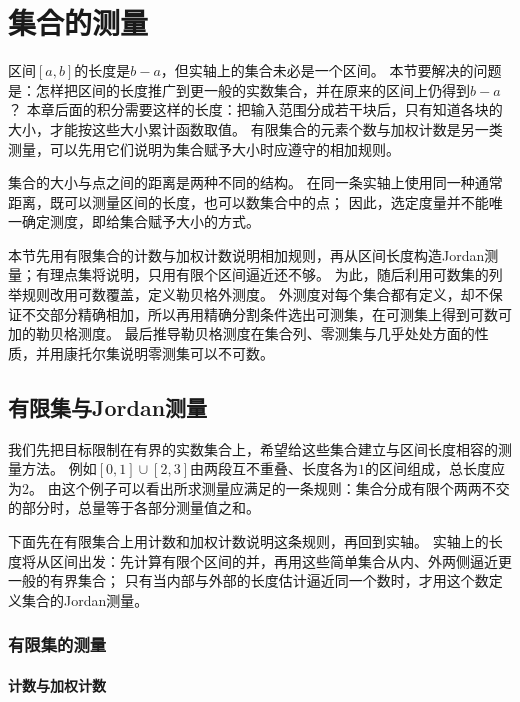 \section{集合的测量}
\label{sec:comb-set-measurement}
\label{sec:analysis-set-structures}

区间$[a,b]$的长度是$b-a$，但实轴上的集合未必是一个区间。
本节要解决的问题是：怎样把区间的长度推广到更一般的实数集合，并在原来的区间上仍得到$b-a$？
本章后面的积分需要这样的长度：把输入范围分成若干块后，只有知道各块的大小，才能按这些大小累计函数取值。
有限集合的元素个数与加权计数是另一类测量，可以先用它们说明为集合赋予大小时应遵守的相加规则。

集合的大小与点之间的距离是两种不同的结构。
在同一条实轴上使用同一种通常距离，既可以测量区间的长度，也可以数集合中的点；
因此，选定度量并不能唯一确定测度，即给集合赋予大小的方式。

本节先用有限集合的计数与加权计数说明相加规则，再从区间长度构造Jordan测量；有理点集将说明，只用有限个区间逼近还不够。
为此，随后利用可数集的列举规则改用可数覆盖，定义勒贝格外测度。
外测度对每个集合都有定义，却不保证不交部分精确相加，所以再用精确分割条件选出可测集，在可测集上得到可数可加的勒贝格测度。
最后推导勒贝格测度在集合列、零测集与几乎处处方面的性质，并用康托尔集说明零测集可以不可数。

\subsection{有限集与Jordan测量}
\label{sec:comb-counting-to-weight}

我们先把目标限制在有界的实数集合上，希望给这些集合建立与区间长度相容的测量方法。
例如$[0,1]\cup[2,3]$由两段互不重叠、长度各为$1$的区间组成，总长度应为$2$。
由这个例子可以看出所求测量应满足的一条规则：集合分成有限个两两不交的部分时，总量等于各部分测量值之和。

下面先在有限集合上用计数和加权计数说明这条规则，再回到实轴。
实轴上的长度将从区间出发：先计算有限个区间的并，再用这些简单集合从内、外两侧逼近更一般的有界集合；
只有当内部与外部的长度估计逼近同一个数时，才用这个数定义集合的Jordan测量。

\subsubsection{有限集的测量}

\paragraph{计数与加权计数}

